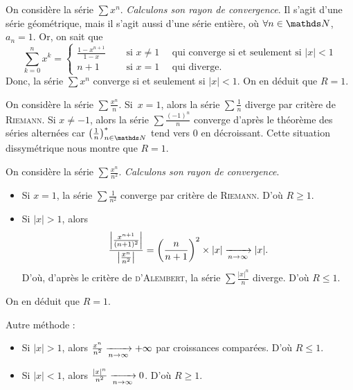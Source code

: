 \begin{exm}
	On considère la série $\sum x^n$.
	\textsl{Calculons son rayon de convergence}. Il s'agit d'une série géométrique, mais il s'agit aussi d'une série entière, où $\forall n \in \N$, $a_n = 1$. Or, on sait que \[
		\sum_{k=0}^n x^k = \begin{cases}
			\frac{1-x^{n+1}}{1-x} & \quad \text{ si } x \neq 1 \quad \text{ qui converge si et seulement si } |x| < 1\\
			n + 1 & \quad \text{ si } x = 1 \quad \text{ qui diverge}.
		\end{cases}
	\] Donc, la série $\sum x^n$\/ converge si et seulement si $|x| < 1$.
	On en déduit que $R = 1$.
\end{exm}

\begin{exm}
	On considère la série $\sum \frac{x^n}{n}$.
	Si~$x = 1$, alors la série $\sum \frac{1}{n}$\/ diverge par critère de \textsc{Riemann}. Si $x \neq -1$, alors la série $\sum \frac{(-1)^n}{n}$\/ converge d'après le théorème des séries alternées car $\big(\frac{1}{n}\big)_{n\in\N}^*$\/ tend vers 0 en décroissant.
	Cette situation dissymétrique nous montre que $R = 1$.
\end{exm}

\begin{exm}
	On considère la série $\sum \frac{x^n}{n^2}$. \textsl{Calculons son rayon de convergence}.
	\begin{itemize}
		\item Si $x = 1$, la série $\sum \frac{1}{n^2}$\/ converge par critère de \textsc{Riemann}. D'où $R \ge 1$.
		\item Si $|x| > 1$, alors \[
				\frac{\left| \frac{x^{n+1}}{(n+1)^2} \right|}{\left| \frac{x^n}{n^2} \right|} = \left( \frac{n}{n+1} \right)^2  \times |x| \xrightarrow[n\to \infty]{} |x|
		.\] D'où, d'après le critère de \textsc{d'Alembert}, la série $\sum \frac{|x|^n}{n}$\/ diverge. D'où $R \le 1$.
	\end{itemize}
	On en déduit que $R = 1$.

	Autre méthode :
	\begin{itemize}
		\item Si $|x| > 1$, alors $\frac{x^n}{n^2}\xrightarrow[n\to \infty]{} +\infty$\/ par croissances comparées. D'où $R \le 1$.
		\item Si $|x| < 1$, alors $\frac{|x|^n}{n^2} \xrightarrow[n\to \infty]{} 0$. D'où $R \ge 1$.
	\end{itemize}
\end{exm}

